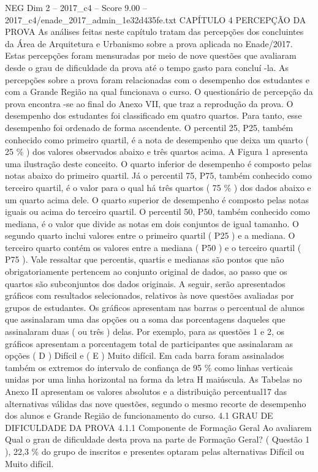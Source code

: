 \begin{textsample}{NEG Dim 2 – 2017\_c4 – Score 9.00 – 2017\_c4/enade\_2017\_admin\_1e32d435fe.txt}  \label{ex:f2_neg_337}
CAPÍTULO 4 PERCEPÇÃO DA PROVA As análises feitas neste capítulo tratam das percepções dos concluintes da Área de Arquitetura e Urbanismo sobre a prova aplicada no Enade/2017.
Estas percepções foram mensuradas por meio de nove questões que avaliaram desde o grau de dificuldade da prova até o tempo gasto para concluí -la.
As percepções sobre a prova foram relacionadas com o desempenho dos estudantes e com a Grande Região na qual funcionava o curso.
O questionário de percepção da prova encontra -se ao final do Anexo VII, que traz a reprodução da prova.
O desempenho dos estudantes foi classificado em quatro quartos.
Para tanto, esse desempenho foi ordenado de forma ascendente.
O percentil 25, P25, também conhecido como primeiro quartil, é a nota de desempenho que deixa um quarto ( 25 \% ) dos valores observados abaixo e três quartos acima.
A Figura 1 apresenta uma ilustração deste conceito.
O quarto inferior de desempenho é composto pelas notas abaixo do primeiro quartil.
Já o percentil 75, P75, também conhecido como terceiro quartil, é o valor para o qual há três quartos ( 75 \% ) dos dados abaixo e um quarto acima dele.
O quarto superior de desempenho é composto pelas notas iguais ou acima do terceiro quartil.
O percentil 50, P50, também conhecido como mediana, é o valor que divide as notas em dois conjuntos de igual tamanho.
O segundo quarto inclui valores entre o primeiro quartil ( P25 ) e a mediana.
O terceiro quarto contém os valores entre a mediana ( P50 ) e o terceiro quartil ( P75 ).
Vale ressaltar que percentis, quartis e medianas são pontos que não obrigatoriamente pertencem ao conjunto original de dados, ao passo que os quartos são subconjuntos dos dados originais.
A seguir, serão apresentados gráficos com resultados selecionados, relativos às nove questões avaliadas por grupos de estudantes.
Os gráficos apresentam nas barras o percentual de alunos que assinalaram uma das opções ou a soma das porcentagens daqueles que assinalaram duas ( ou três ) delas.
Por exemplo, para as questões 1 e 2, os gráficos apresentam a porcentagem total de participantes que assinalaram as opções ( D ) Difícil e ( E ) Muito difícil.
Em cada barra foram assinalados também os extremos do intervalo de confiança de 95 \% como linhas verticais unidas por uma linha horizontal na forma da letra H maiúscula.
As Tabelas no Anexo II apresentam os valores absolutos e a distribuição percentual17 das alternativas válidas das nove questões, segundo o mesmo recorte de desempenho dos alunos e Grande Região de funcionamento do curso. 4.1 GRAU DE DIFICULDADE DA PROVA 4.1.1 Componente de Formação Geral Ao avaliarem Qual o grau de dificuldade desta prova na parte de Formação Geral? ( Questão 1 ), 22,3 \% do grupo de inscritos e presentes optaram pelas alternativas Difícil ou Muito difícil.

\end{textsample}
